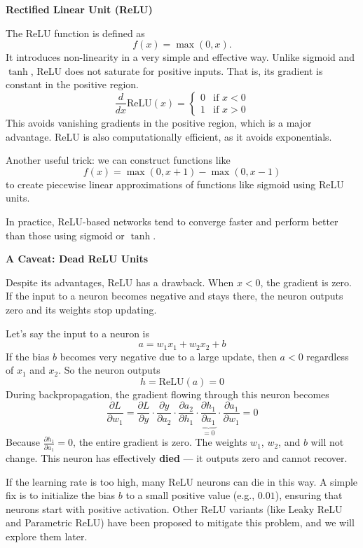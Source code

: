 \textbf{Rectified Linear Unit (ReLU)}

The ReLU function is defined as
\[
f(x) = \max(0, x).
\]
It introduces non-linearity in a very simple and effective way. Unlike sigmoid and $\tanh$, ReLU does not saturate for positive inputs. That is, its gradient is constant in the positive region.
\[
\frac{d}{dx}\text{ReLU}(x) = 
\begin{cases}
0 & \text{if } x < 0 \\
1 & \text{if } x > 0
\end{cases}
\]
This avoids vanishing gradients in the positive region, which is a major advantage. ReLU is also computationally efficient, as it avoids exponentials.

Another useful trick: we can construct functions like
\[
f(x) = \max(0, x+1) - \max(0, x-1)
\]
to create piecewise linear approximations of functions like sigmoid using ReLU units.

In practice, ReLU-based networks tend to converge faster and perform better than those using sigmoid or $\tanh$.

\textbf{A Caveat: Dead ReLU Units}

Despite its advantages, ReLU has a drawback. When $x < 0$, the gradient is zero. If the input to a neuron becomes negative and stays there, the neuron outputs zero and its weights stop updating.

Let’s say the input to a neuron is 
\[
a = w_1 x_1 + w_2 x_2 + b
\]
If the bias $b$ becomes very negative due to a large update, then $a < 0$ regardless of $x_1$ and $x_2$. So the neuron outputs
\[
h = \text{ReLU}(a) = 0
\]
During backpropagation, the gradient flowing through this neuron becomes
\[
\frac{\partial L}{\partial w_1} = \frac{\partial L}{\partial y} \cdot \frac{\partial y}{\partial a_2} \cdot \frac{\partial a_2}{\partial h_1} \cdot \underbrace{\frac{\partial h_1}{\partial a_1}}_{=0} \cdot \frac{\partial a_1}{\partial w_1} = 0
\]
Because $\frac{\partial h_1}{\partial a_1} = 0$, the entire gradient is zero. The weights $w_1$, $w_2$, and $b$ will not change. This neuron has effectively \textbf{died} — it outputs zero and cannot recover.

If the learning rate is too high, many ReLU neurons can die in this way. A simple fix is to initialize the bias $b$ to a small positive value (e.g., $0.01$), ensuring that neurons start with positive activation. Other ReLU variants (like Leaky ReLU and Parametric ReLU) have been proposed to mitigate this problem, and we will explore them later.

